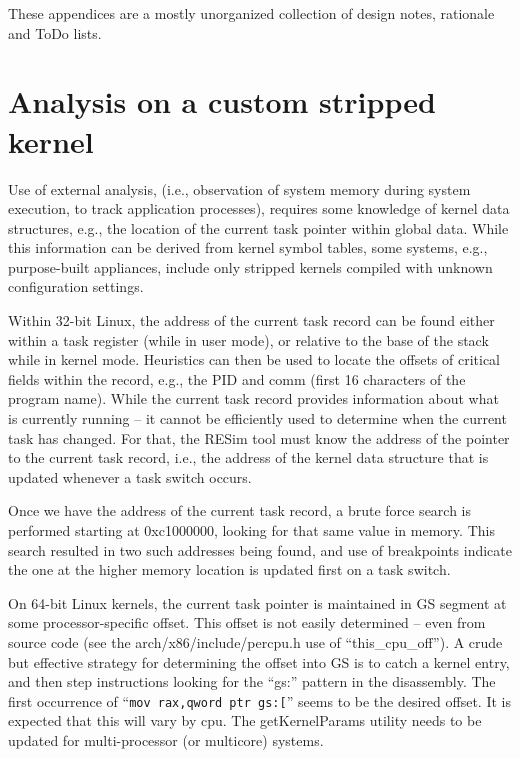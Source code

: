 \documentclass[titlepage]{article}
\begin{document}
\pagebreak
\begin{appendices}
These appendices are a mostly unorganized collection of design notes, rationale and ToDo lists.
\section{Analysis on a custom stripped kernel}
Use of external analysis, (i.e., observation of system memory during system execution, to track application processes), requires some knowledge of kernel data structures, e.g., the location of the current task pointer within global data.   While this information can be derived from kernel symbol tables, some systems, e.g., purpose-built appliances, include only stripped kernels compiled with unknown configuration settings.

Within 32-bit Linux, the address of the current task record can be found either within a task register (while in user mode), or relative to the base of the stack while in kernel mode.  Heuristics can then be used to locate the offsets of critical fields within the record, e.g., the PID and comm (first 16 characters of the program name).  While the current task record provides information about what is currently running – it cannot be efficiently used to determine when the current task has changed.  For that, the RESim tool must know the address of the pointer to the current task record, i.e., the address of the kernel data structure that is updated whenever a task switch occurs.

Once we have the address of the current task record, a brute force search is performed starting at 0xc1000000, looking for that same value in memory.  This search resulted in two such addresses being found, and use of breakpoints indicate the one at the higher memory location is updated first on a task switch. 

On 64-bit Linux kernels, the current task pointer is maintained in GS segment at some processor-specific offset.  This offset is not easily determined – even from source code (see the arch/x86/include/percpu.h use of “this\_cpu\_off”).  A crude but effective strategy for determining the offset into GS is to catch a kernel entry, and then step instructions looking for the ``gs:'' pattern in the disassembly.  The first occurrence of ``{\tt mov rax,qword ptr gs:[}''  seems to be the desired offset.  It is expected that this will vary by cpu. The getKernelParams utility needs to be updated for multi-processor (or multicore) systems.


\end{appendices}
\end{document}
